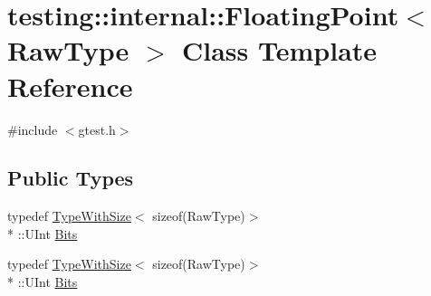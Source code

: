 \hypertarget{classtesting_1_1internal_1_1_floating_point}{\section{testing\-:\-:internal\-:\-:Floating\-Point$<$ Raw\-Type $>$ Class Template Reference}
\label{classtesting_1_1internal_1_1_floating_point}
}


{\ttfamily \#include $<$gtest.\-h$>$}

\subsection*{Public Types}
\begin{DoxyCompactItemize}
\item 
typedef \hyperlink{classtesting_1_1internal_1_1_type_with_size}{Type\-With\-Size}$<$ sizeof(Raw\-Type)$>$\\*
\-::U\-Int \hyperlink{classtesting_1_1internal_1_1_floating_point_abf228bf6cd48f12c8b44c85b4971a731}{Bits}
\item 
typedef \hyperlink{classtesting_1_1internal_1_1_type_with_size}{Type\-With\-Size}$<$ sizeof(Raw\-Type)$>$\\*
\-::U\-Int \hyperlink{classtesting_1_1internal_1_1_floating_point_abf228bf6cd48f12c8b44c85b4971a731}{Bits}
\end{DoxyCompactItemize}
